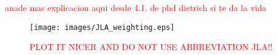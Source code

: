 \textcolor{red}{anade mas explicacion aqui desde 4.1. de phd dietrich si te da la vida}


\begin{figure}[!htb]
	\centerline{
		\texttt{[image: images/JLA\_weighting.eps]}}
	\caption{\textcolor{red}{PLOT IT NICER AND DO NOT USE ABBREVIATION JLA!!}}
	\label{fig:wf_for_jla}
\end{figure}







